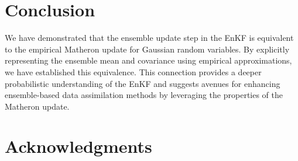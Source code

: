 \documentclass{article}
\begin{document}
\section{Conclusion}

We have demonstrated that the ensemble update step in the EnKF is equivalent to the empirical Matheron update for Gaussian random variables. By explicitly representing the ensemble mean and covariance using empirical approximations, we have established this equivalence. This connection provides a deeper probabilistic understanding of the EnKF and suggests avenues for enhancing ensemble-based data assimilation methods by leveraging the properties of the Matheron update.

\section*{Acknowledgments}




\end{document}

